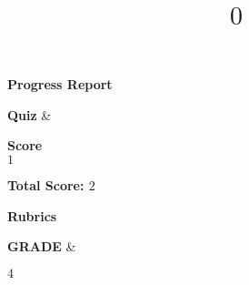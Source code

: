 \documentclass[10pt,landscape]{article}
\begin{document}
\title{\Huge $0$}
\author{}
\date{}
\maketitle

\begin{center}
    \textbf{\Large Progress Report}
\end{center}

\begin{center}
    \begin{tabular}[p{4cm}  p{4cm}]
        \hline
        \textbf{Quiz} & \rule[-0.5cm]{0pt}{1cm} \textbf{Score} \\
        \hline
        \vspace{0.15cm}
        $1$
        \hline
    \end{tabular}
\end{center}

\begin{center}
    \textbf{Total Score: $2$}
\end{center}
\vspace{1.2cm}
\begin{center}
    \textbf{\Large Rubrics}
\end{center}
\vspace{1cm}
\begin{center}
    \begin{tabular}[p{10cm} p{2cm}]
        \hline
        \textbf{GRADE} & \rule[-0.5cm]{0pt}{1.2cm} \textbf{\Large $4$} \\
        \hline
    \end{tabular}
\end{center}
\end{document}
